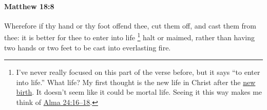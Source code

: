 			\begin{framed}
			\scriptsize
				\begin{compactdesc}
					\item[SBLG] 
				\end{compactdesc}
			\end{framed}

		\paragraph{Matthew 18:8} %
			\label{MATTHEW-18-8}

			Wherefore if thy hand or thy foot offend thee, cut them off, and cast them from thee: it is better for thee to enter into life%
				\footnote{%
					I've never really focused on this part of the verse before, but it says ``to enter into life.'' What life? My first thought is the new life in Christ after the \hyperref[NEWBIRTH]{new birth}. It doesn't seem like it could be mortal life. Seeing it this way makes me think of \hyperref[ALMA-24-16]{Alma 24:16--18}.
					}
			halt or maimed, rather than having two hands or two feet to be cast into everlasting fire.


